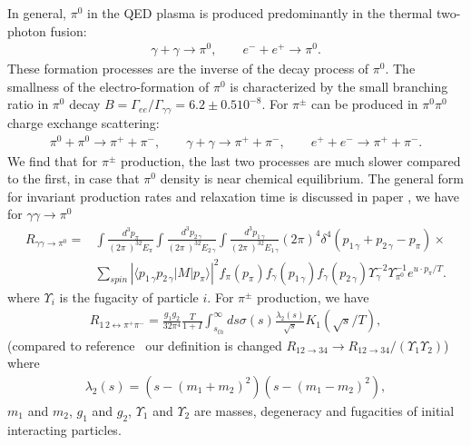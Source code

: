 \documentclass[universe,article,submit,moreauthors,pdftex,a4paper]{Definitions/mdpi}
\begin{document}
In general, $\pi^0$ in the QED plasma is produced predominantly in the thermal two-photon fusion:
\begin{align}
\gamma+\gamma \rightarrow \pi^0 ,\qquad e^-+e^+ \rightarrow \pi^0. 
\end{align}
These formation processes are the inverse of the decay process of $\pi^0$. The smallness of the electro-formation of $\pi^0$ is characterized by the small  branching ratio in $\pi^0$ decay $B=\Gamma_{ee}/\Gamma_{\gamma\gamma}=6.2\pm 0.5 10^{-8}$.
For $\pi^{\pm}$ can be produced in $\pi^0\pi^0$ charge exchange scattering:
\begin{align}
\pi^0 + \pi^0 \rightarrow \pi^{+} + \pi^{-}, \qquad\gamma+\gamma \rightarrow \pi^{+} + \pi^{-}, \qquad
e^+ + e^- \rightarrow \pi^{+} + \pi^{-}. 
\end{align}
We find  that for $\pi^{\pm}$ production, the last two processes are much slower compared to the first, in case that $\pi^0$ density is near chemical equilibrium. The general form for invariant production rates and relaxation time is discussed in paper \cite{Kuznetsova:2008jt}, we have for $\gamma\gamma\to\pi^0$
\begin{align}
R_{\gamma\gamma\to\pi^0}=&\int\frac{d^{3}{p_{\pi}}}{(2\pi\ )^32E_{\pi}}
   \int\frac{d^{3} {p_{2\,\gamma}}}{(2\pi\ )^32E_{2\,\gamma}}
   \int\frac{d^{3}{p_{1\,\gamma}}} {(2\pi\ )^32E_{1\,\gamma} }\left(2\pi\right)^{4}
 \delta^{4}\left(p_{1\,\gamma}+p_{2\,\gamma}-p_{\pi}\right)\times \nonumber\\ &
  \sum_{spin}\left|\langle p_{1\,\gamma}p_{2\,\gamma}\left| M\right|p_{\pi}\rangle\right|^{2}
   f_{\pi}(p_{\pi})f_{\gamma}(p_{1\,\gamma})f_{\gamma}(p_{2\,\gamma})
 \Upsilon^{-2}_{\gamma}\Upsilon_{\pi^{0}}^{-1}e^{u \cdot p_{\pi}/T}. \label{pi0pr}
 \end{align}
where $\Upsilon_i$ is the fugacity of particle $i$. For $\pi^\pm$ production, we have
\begin{align}
{R_{1\,2 \leftrightarrow \pi^+\pi^-}} = \frac{g_1g_2}{32\pi^4}\frac{T}{1+I}
\int_{s_{th}}^{\infty}ds\sigma(s)\frac{\lambda_2(s)}{\sqrt{s}}K_1(\sqrt{s}/T),
\end{align}
(compared to reference~\cite{Letessier:2002gp} our definition is changed 
$R_{12\rightarrow 34} \rightarrow 
R_{12 \rightarrow 34}/(\Upsilon_1 \Upsilon_2)$)
where
\begin{align}
\lambda_2(s) = (s-(m_{1}+m_2)^2)(s-(m_1-m_2)^2),
\end{align}
$m_1$ and $m_2$, $g_1$ and $g_2$, $\Upsilon_1$ and $\Upsilon_2$ are masses, degeneracy and fugacities of initial interacting particles. 
\end{document}
